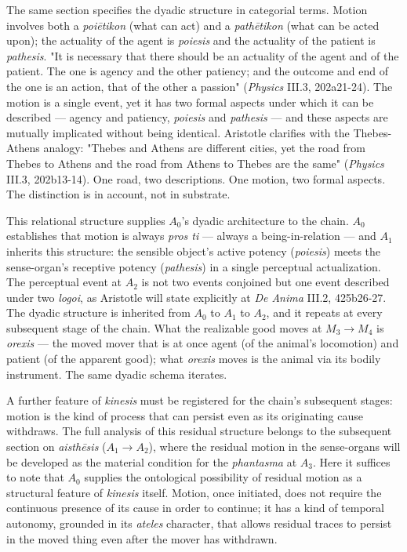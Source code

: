 \documentclass[12pt]{article}
\begin{document}
The same section specifies the dyadic structure in categorial terms. Motion involves both a \textit{poiētikon} (what can act) and a \textit{pathētikon} (what can be acted upon); the actuality of the agent is \textit{poiesis} and the actuality of the patient is \textit{pathesis}. "It is necessary that there should be an actuality of the agent and of the patient. The one is agency and the other patiency; and the outcome and end of the one is an action, that of the other a passion" (\textit{Physics} III.3, 202a21-24). The motion is a single event, yet it has two formal aspects under which it can be described --- agency and patiency, \textit{poiesis} and \textit{pathesis} --- and these aspects are mutually implicated without being identical. Aristotle clarifies with the Thebes-Athens analogy: "Thebes and Athens are different cities, yet the road from Thebes to Athens and the road from Athens to Thebes are the same" (\textit{Physics} III.3, 202b13-14). One road, two descriptions. One motion, two formal aspects. The distinction is in account, not in substrate.

This relational structure supplies $A_0$'s dyadic architecture to the chain. $A_0$ establishes that motion is always \textit{pros ti} --- always a being-in-relation --- and $A_1$ inherits this structure: the sensible object's active potency (\textit{poiesis}) meets the sense-organ's receptive potency (\textit{pathesis}) in a single perceptual actualization. The perceptual event at $A_2$ is not two events conjoined but one event described under two \textit{logoi}, as Aristotle will state explicitly at \textit{De Anima} III.2, 425b26-27. The dyadic structure is inherited from $A_0$ to $A_1$ to $A_2$, and it repeats at every subsequent stage of the chain. What the realizable good moves at $M_3$$\to$$M_4$ is \textit{orexis} --- the moved mover that is at once agent (of the animal's locomotion) and patient (of the apparent good); what \textit{orexis} moves is the animal via its bodily instrument. The same dyadic schema iterates.

A further feature of \textit{kinesis} must be registered for the chain's subsequent stages: motion is the kind of process that can persist even as its originating cause withdraws. The full analysis of this residual structure belongs to the subsequent section on \textit{aisthēsis} ($A_1$$\to$$A_2$), where the residual motion in the sense-organs will be developed as the material condition for the \textit{phantasma} at $A_3$. Here it suffices to note that $A_0$ supplies the ontological possibility of residual motion as a structural feature of \textit{kinesis} itself. Motion, once initiated, does not require the continuous presence of its cause in order to continue; it has a kind of temporal autonomy, grounded in its \textit{ateles} character, that allows residual traces to persist in the moved thing even after the mover has withdrawn.
\end{document}

